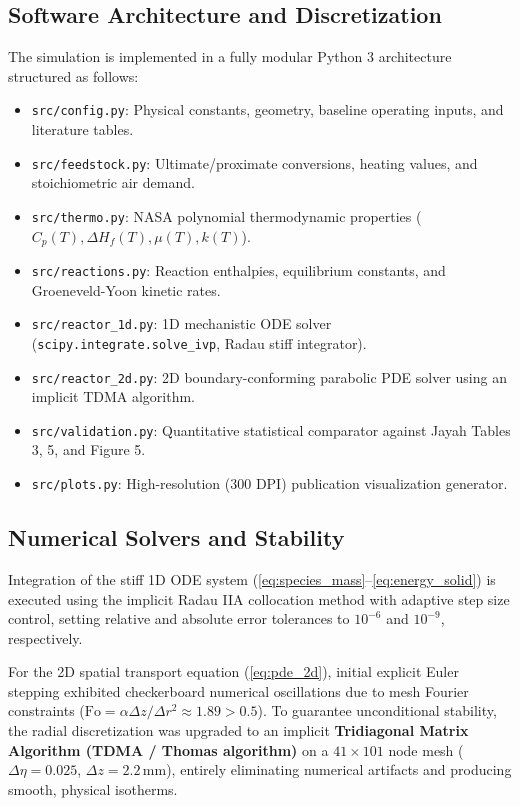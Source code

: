 \documentclass[11pt,a4paper]{article}
\begin{document}
\subsection{Software Architecture and Discretization}
The simulation is implemented in a fully modular Python 3 architecture structured as follows:
\begin{itemize}[leftmargin=1.5em]
    \item \texttt{src/config.py}: Physical constants, geometry, baseline operating inputs, and literature tables.
    \item \texttt{src/feedstock.py}: Ultimate/proximate conversions, heating values, and stoichiometric air demand.
    \item \texttt{src/thermo.py}: NASA polynomial thermodynamic properties ($C_p(T), \Delta H_f(T), \mu(T), k(T)$).
    \item \texttt{src/reactions.py}: Reaction enthalpies, equilibrium constants, and Groeneveld-Yoon kinetic rates.
    \item \texttt{src/reactor\_1d.py}: 1D mechanistic ODE solver (\texttt{scipy.integrate.solve\_ivp}, Radau stiff integrator).
    \item \texttt{src/reactor\_2d.py}: 2D boundary-conforming parabolic PDE solver using an implicit TDMA algorithm.
    \item \texttt{src/validation.py}: Quantitative statistical comparator against Jayah Tables 3, 5, and Figure 5.
    \item \texttt{src/plots.py}: High-resolution (300 DPI) publication visualization generator.
\end{itemize}

\subsection{Numerical Solvers and Stability}
Integration of the stiff 1D ODE system (\ref{eq:species_mass}--\ref{eq:energy_solid}) is executed using the implicit Radau IIA collocation method with adaptive step size control, setting relative and absolute error tolerances to $10^{-6}$ and $10^{-9}$, respectively. 

For the 2D spatial transport equation (\ref{eq:pde_2d}), initial explicit Euler stepping exhibited checkerboard numerical oscillations due to mesh Fourier constraints ($\text{Fo} = \alpha \Delta z / \Delta r^2 \approx 1.89 > 0.5$). To guarantee unconditional stability, the radial discretization was upgraded to an implicit \textbf{Tridiagonal Matrix Algorithm (TDMA / Thomas algorithm)} on a $41 \times 101$ node mesh ($\Delta \eta = 0.025$, $\Delta z = 2.2$\,mm), entirely eliminating numerical artifacts and producing smooth, physical isotherms.
\end{document}
